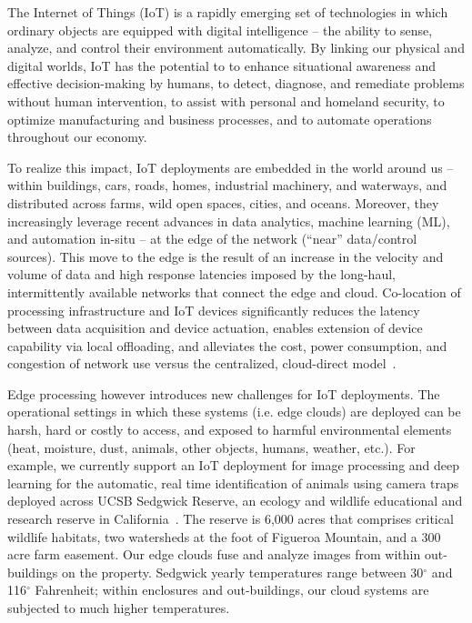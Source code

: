 The Internet of Things (IoT) is a rapidly emerging
set of technologies in which ordinary objects are equipped with digital
intelligence -- the ability to sense, analyze, and control their
environment automatically. By linking our physical and digital worlds, IoT
has the potential to to enhance
situational awareness and effective decision-making by humans, to detect,
diagnose, and remediate problems without human intervention, to assist with
personal and homeland security, to optimize manufacturing and business
processes, and to automate operations throughout our economy.

To realize this impact, IoT deployments are embedded in the world around 
us -- within buildings, cars, roads, homes, industrial machinery, 
and waterways, and distributed across farms, wild open spaces, cities, and oceans.
Moreover, they increasingly leverage
recent advances in data analytics, machine learning (ML), and automation in-situ -- at
the edge of the network (``near'' data/control sources).
This move to the edge is the result of an increase in the velocity and volume of
data and high response latencies imposed by the
long-haul, intermittently available networks that connect the edge and cloud.
Co-location of processing infrastructure and IoT devices
significantly reduces the latency between data acquisition and device
actuation, enables extension of device capability via local offloading,
and alleviates the cost, power consumption, and congestion of network use
versus the centralized, cloud-direct
model~\cite{edge,bonomi2012fog,cloudlets,cloudlets2012satya,verbelen2012cloudlets}.

Edge processing however introduces new challenges for IoT deployments.
The operational settings in which these systems (i.e. edge clouds) are deployed
can be harsh, hard or costly to access, and exposed to harmful
environmental elements (heat, moisture, dust, animals, other objects, humans, weather, etc.).
For example, we currently support an IoT deployment for image processing and 
deep learning for the automatic, real time identification of animals
using camera traps deployed across UCSB Sedgwick Reserve, an
ecology and wildlife educational and research reserve in California~\cite{ref:sedgwick}. 
The reserve is 6,000 acres that comprises critical wildlife habitats, 
two watersheds at the foot of Figueroa Mountain, and a 300 acre farm easement. 
Our edge clouds fuse and analyze images
from within out-buildings on the property. Sedgwick yearly
temperatures range between 30$^{\circ}$ and 116$^{\circ}$ Fahrenheit; within
enclosures and out-buildings, our cloud systems are subjected 
to much higher temperatures.

